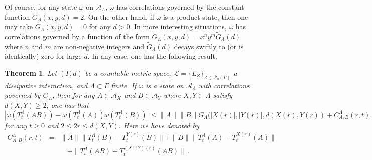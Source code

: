 \documentclass{article}
\newcommand{\A}{\mathcal{A}}
\newcommand{\<}{\langle}
\renewcommand{\>}{\rangle}
\numberwithin{equation}{section}
\newtheorem{thm}{Theorem}[section]
\theoremstyle{definition}
\begin{document}
Of course, for any state $\omega$ on $\A_{\Lambda}$, $\omega$ has correlations governed by 
the constant function $G_{\Lambda}(x,y,d) =2$. On the other hand, if $\omega$ is a 
product state, then one may take $G_{\Lambda}(x,y,d) =0$ for any $d>0$. In more interesting situations, $\omega$ has
correlations governed by a function of the form $G_{\Lambda}(x,y,d) = x^ny^m \tilde{G}_{\Lambda}(d)$ 
where $n$ and $m$ are non-negative integers and $\tilde{G}_{\Lambda}(d)$ decays swiftly to (or is identically) zero for large $d$. In any case, one has the following result.

\begin{thm}\label{thm:g_decaying}
Let $(\Gamma, d)$ be a countable metric space, $\mathscr{L} = \{L_Z \}_{Z \in \mathcal{P}_0(\Gamma)}$ a dissipative interaction,
and $\Lambda \subset \Gamma$ finite. If $\omega$ is a state on $\A_{\Lambda}$ with correlations
governed by $G_{\Lambda}$, then for any $A \in \A_X$ and $B \in \A_Y$ where $X,Y \subset \Lambda$ 
satisfy $d(X,Y) \geq 2$, one has that
\begin{equation} \label{base_cor_est}
\left|  \omega(T_t^{\Lambda}(AB)) - \omega(T_t^{\Lambda}(A)) \omega(T_t^{\Lambda}(B))\right| \leq \|A \| \|B \| G_{\Lambda}(|X(r)|, |Y(r)|,d(X(r), Y(r)) +C_{A,B}^{\Lambda}(r,t).
\end{equation}
for any $t \geq 0$ and $2 \leq 2r \leq d(X,Y)$. Here we have denoted by
\begin{eqnarray} \label{def_cab}
C_{A,B}^{\Lambda}(r,t) & = &  \| A \| \| T_t^{\Lambda}(B) - T_t^{Y(r)}(B) \| +  \| B \| \| T_t^{\Lambda}(A) - T_t^{X(r)}(A) \| \nonumber \\
& \mbox{ } & \quad + \| T_t^{\Lambda}(AB) - T_t^{(X \cup Y)(r)}(AB) \| \, .
\end{eqnarray} 
\end{thm}
\end{document}
